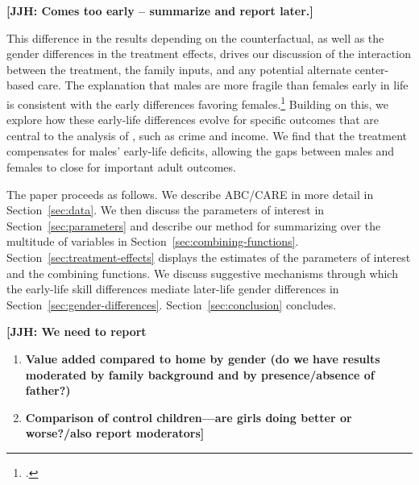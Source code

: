 \textbf{[JJH: Comes too early -- summarize and report later.]}

This difference in the results depending on the counterfactual, as well as the gender differences in the treatment effects, drives our discussion of the interaction between the treatment, the family inputs, and any potential alternate center-based care. The explanation that males are more fragile than females early in life is consistent with the early differences favoring females.\footnote{\citet{Kottelenberg-Lehrer_2014_Gender-Effects,Baker_Gruber_Milligan_2015_Noncog_Defects, Schore_2017_IMHJ}.} Building on this, we explore how these early-life differences evolve for specific outcomes that are central to the analysis of  \citet{Garcia_Heckman_Leaf_etal_2017_Comp_CBA_Unpublished}, such as crime and income. We find that the treatment compensates for males' early-life deficits, allowing the gaps between males and females to close for important adult outcomes.

The paper proceeds as follows. We describe ABC/CARE in more detail in Section~\ref{sec:data}. We then discuss the parameters of interest in Section~\ref{sec:parameters} and describe our method for summarizing over the multitude of variables in Section~\ref{sec:combining-functions}. Section~\ref{sec:treatment-effects} displays the estimates of the parameters of interest and the combining functions. We discuss suggestive mechanisms through which the early-life skill differences mediate later-life gender differences in Section~\ref{sec:gender-differences}. Section~\ref{sec:conclusion} concludes.


\textbf{[JJH: We need to report}
\begin{enumerate}[7(a)]
\item \textbf{Value added compared to home by gender (do we have results moderated by family background and by presence/absence of father?)}
\item \textbf{Comparison of control children---are girls doing better or worse?/also report moderators]}
\end{enumerate}


